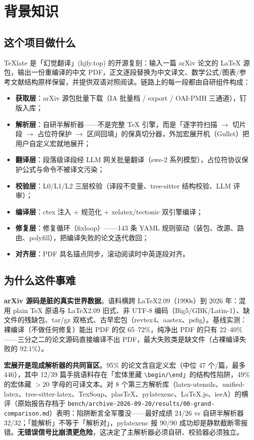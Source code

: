 \section{背景知识}

\subsection{这个项目做什么}

TeXlate 是「幻觉翻译」(hjfy.top) 的开源复刻：输入一篇 arXiv 论文的 LaTeX 源包，输出一份重编译的中文 PDF，正文逐段替换为中文译文、数学公式/图表/参考文献结构原样保留，并提供双语对照阅读。链路上的每一段都由自研组件构成：

\begin{itemize}
  \item \textbf{获取层}：arXiv 源包批量下载（IA 批量档 / export / OAI-PMH 三通道），钉版入库；
  \item \textbf{解析层}：自研半解析器——不是完整 TeX 引擎，而是「逐字符扫描 $\to$ 切片段 $\to$ 占位符保护 $\to$ 区间回填」的保真切分器，外加宏展开机（Gullet）把用户自定义宏就地展开；
  \item \textbf{翻译层}：段落级译段经 LLM 网关批量翻译（swe-2 系列模型），占位符协议保护公式与命令不被译文污染；
  \item \textbf{校验层}：L0/L1/L2 三层校验（译段不变量、tree-sitter 结构校验、LLM 评审）；
  \item \textbf{编译层}：ctex 注入 + 规范化 + xelatex/tectonic 双引擎编译；
  \item \textbf{修复层}：修复循环（fixloop）——143 条 YAML 规则驱动（装包、改源、路由、polyfill），把编译失败的论文迭代救回；
  \item \textbf{对齐层}：PDF 具名锚点同步，滚动阅读时中英逐段对齐。
\end{itemize}

\subsection{为什么这件事难}

\textbf{arXiv 源码是脏的真实世界数据}。语料横跨 LaTeX2.09（1990s）到 2026 年：混用 plain \TeX{} 原语与 LaTeX2.09 旧式、非 UTF-8 编码（Big5/GBK/Latin-1）、缺文件的残缺包、tar/gz 双格式、古早宏包（revtex4、aastex、psfig）。基线实测：裸编译（不做任何修复）能出 PDF 的仅 65--72\%，纯净出 PDF 的只有 22--40\%——三分之二的论文源码直接编译不出 PDF，最大失败类是缺文件（占裸编译失败的 92.1\%）。

\textbf{宏展开是现成解析器的共同盲区}。95\% 的论文含自定义宏（中位 47 个/篇，最多 446），其中 12/39 篇手挑语料存在「宏体里藏 \verb|\begin/\end|」的结构性陷阱，49\% 的宏体藏 $>20$ 字母的可译文本。对 8 个第三方解析库（latex-utensils、unified-latex、tree-sitter-latex、TexSoup、plasTeX、pylatexenc、LaTeX.js、ieeA）的横评（原始报告存档于 \texttt{bench/archive-2026-09-20/results/00-grand-comparison.md}）表明：陷阱断言全军覆没——最好成绩 24/26 vs 自研半解析器 32/32；「能解析」不等于「解析对」，pylatexenc 报 90/90 成功却是静默截断零报错。\textbf{无错误信号比崩溃更危险}，这决定了主解析器必须自研、校验器必须独立。

